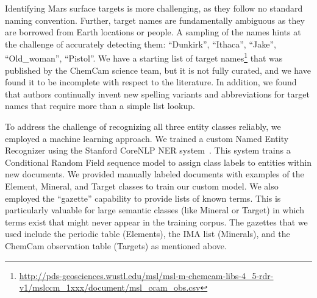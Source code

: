 \documentclass[letterpaper]{article} %
\begin{document}
Identifying Mars surface targets is more challenging, as they follow
no standard naming convention.  Further, target names are
fundamentally ambiguous as they are borrowed from Earth locations or
people.  A sampling of the names hints at the challenge of accurately
detecting them: ``Dunkirk'', ``Ithaca'', ``Jake'', ``Old\_woman'',
``Pistol''.  We have a starting list of target
names\footnote{\url{http://pds-geosciences.wustl.edu/msl/msl-m-chemcam-libs-4_5-rdr-v1/mslccm_1xxx/document/msl_ccam_obs.csv}}
that was published by the ChemCam science team, but it is not fully
curated, and we have found it to be incomplete with respect to the
literature.
%
In addition, we found that authors continually invent new spelling
variants and abbreviations for target names that require more than a
simple list lookup.

To address the challenge of recognizing all three entity classes
reliably, we employed a machine learning approach.  We trained a
custom Named Entity Recognizer using the Stanford CoreNLP NER
system~\cite{finkel:ner05}.  This system trains a Conditional Random
Field sequence model to assign class labels to entities within new
documents.  We provided manually labeled documents with examples of
the Element, Mineral, and Target classes to train our custom
model.  We also employed the ``gazette'' capability to provide lists
of known terms.  This is particularly valuable for large semantic
classes (like Mineral or Target) in which terms exist that might never
appear in the training corpus.  The gazettes that we used include the
periodic table (Elements), the IMA list (Minerals), and the ChemCam
observation table (Targets) as mentioned above.




\end{document}
